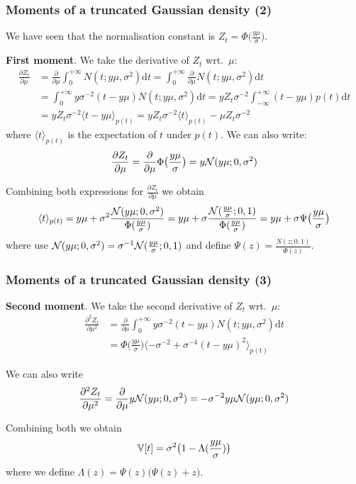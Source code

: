 \begin{frame}
\frametitle{Moments of a truncated Gaussian density (2)}

We have seen that the normalisation constant is $Z_t = \Phi\big(\frac{y\mu}{\sigma}\big)$. 

{\bf First moment}. We take the derivative of $Z_t$ wrt.\ $\mu$:
\begin{align*}
\frac{\partial Z_t}{\partial \mu} &= \frac{\partial}{\partial \mu} 
\int_0^{+\infty}\!\! N(t; y\mu, \sigma^2)\mathrm{d}t
= \int_0^{+\infty}\!  \frac{\partial}{\partial \mu}  N(t; y\mu, \sigma^2)\mathrm{d}t\\
&= \int_0^{+\infty}\! y\sigma^{-2}(t-y\mu) N(t; y\mu, \sigma^2)\mathrm{d}t
= y Z_t \sigma^{-2}\int_{-\infty}^{+\infty}\! (t-y\mu) p(t)\mathrm{d}t\\
&= y Z_t \sigma^{-2}\langle t-y\mu\rangle_{p(t)} 
= y Z_t \sigma^{-2}\langle t\rangle_{p(t)} - \mu Z_t \sigma^{-2}
\end{align*}
where $\langle t\rangle_{p(t)}$ is the expectation of $t$ under $p(t)$. We can also write:
\[
\frac{\partial Z_t}{\partial \mu} 
= \frac{\partial}{\partial \mu}\Phi\big(\frac{y\mu}{\sigma}\big)
= y \mathcal{N}(y\mu; 0, \sigma^2)
\]

Combining both expressions for $\frac{\partial Z_t}{\partial \mu}$
we obtain
\[
\langle t\rangle_{p(t)} = y\mu + \sigma^2\frac{\mathcal{N}(y\mu; 0, \sigma^2)}{\Phi(\frac{y\mu}{\sigma})}
= y\mu + \sigma\frac{\mathcal{N}(\frac{y\mu}{\sigma}; 0, 1)}{\Phi(\frac{y\mu}{\sigma})}
= y\mu + \sigma \Psi\big(\frac{y\mu}{\sigma}\big)
\]
where use $\mathcal{N}(y\mu; 0, \sigma^2) = \sigma^{-1}\mathcal{N}(\frac{y\mu}{\sigma}; 0, 1)$
and define $\Psi(z) = \frac{N(z; 0,1)}{\Phi(z)}$.

\end{frame}


\begin{frame}
\frametitle{Moments of a truncated Gaussian density (3)}

{\bf Second moment}. We take the second derivative of $Z_t$ wrt.\ $\mu$:
\begin{align*}
\frac{\partial^2 Z_t}{\partial \mu^2} &= \frac{\partial}{\partial \mu} 
\int_0^{+\infty}\! y\sigma^{-2}(t-y\mu) N(t; y\mu, \sigma^2)\mathrm{d}t\\
& = \Phi\big(\frac{y\mu}{\sigma}\big)\langle -\sigma^{-2} + \sigma^{-4}(t-y\mu)^2\rangle_{p(t)}
\end{align*}

We can also write
\[
\frac{\partial^2 Z_t}{\partial \mu^2} 
= \frac{\partial}{\partial \mu} y\mathcal{N}(y\mu; 0, \sigma^2)
= -\sigma^{-2} y \mu \mathcal{N}(y\mu; 0, \sigma^2)
\]

Combining both we obtain
\[
\mathbb{V}[t] = \sigma^2\big(1 - \Lambda(\frac{y\mu}{\sigma})\big)
\]
where we define $\Lambda(z) = \Psi(z)\big(\Psi(z) + z\big)$.

\end{frame}


